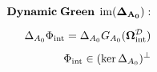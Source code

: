 \documentclass[preview]{standalone}
\begin{document}
\begin{align*}
\special{dvisvgm:raw <g id='unique000'>}\mathbf{Dynamic\;Green\;\operatorname{im}(\Delta_{A_0}):}\\[5pt]\Delta_{A_0}\Phi_{\text{int}} = \Delta_{A_0}G_{A_0}(\mathbf{\Omega}_{\text{int}}^{\mathcal{D}})\\[4pt]\Phi_{\text{int}}\in(\ker\Delta_{A_0})^\perp\special{dvisvgm:raw </g>}
\end{align*}
\end{document}
